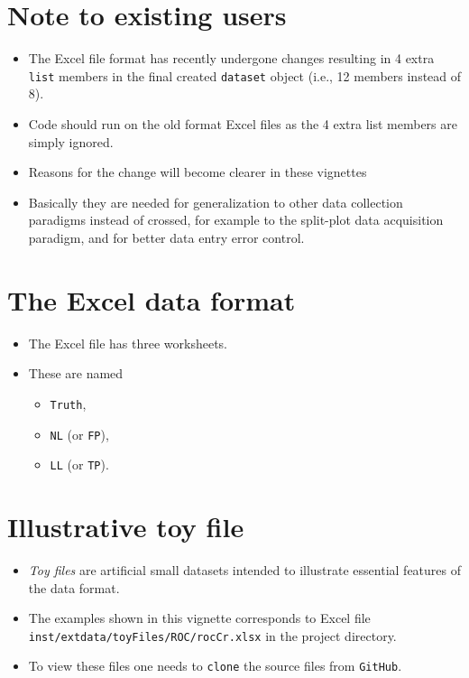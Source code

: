 \documentclass[]{book}
\providecommand{\tightlist}{%
  \setlength{\itemsep}{0pt}\setlength{\parskip}{0pt}}
\begin{document}
\hypertarget{note-to-existing-users}{%
\section{Note to existing users}\label{note-to-existing-users}}

\begin{itemize}
\tightlist
\item
  The Excel file format has recently undergone changes resulting in 4 extra \texttt{list} members in the final created \texttt{dataset} object (i.e., 12 members instead of 8).
\item
  Code should run on the old format Excel files as the 4 extra list members are simply ignored.
\item
  Reasons for the change will become clearer in these vignettes
\item
  Basically they are needed for generalization to other data collection paradigms instead of crossed, for example to the split-plot data acquisition paradigm, and for better data entry error control.
\end{itemize}

\hypertarget{the-excel-data-format}{%
\section{The Excel data format}\label{the-excel-data-format}}

\begin{itemize}
\tightlist
\item
  The Excel file has three worksheets.
\item
  These are named

  \begin{itemize}
  \tightlist
  \item
    \texttt{Truth},
  \item
    \texttt{NL} (or \texttt{FP}),
  \item
    \texttt{LL} (or \texttt{TP}).
  \end{itemize}
\end{itemize}

\hypertarget{illustrative-toy-file}{%
\section{Illustrative toy file}\label{illustrative-toy-file}}

\begin{itemize}
\tightlist
\item
  \emph{Toy files} are artificial small datasets intended to illustrate essential features of the data format.\\
\item
  The examples shown in this vignette corresponds to Excel file \texttt{inst/extdata/toyFiles/ROC/rocCr.xlsx} in the project directory.
\item
  To view these files one needs to \texttt{clone} the source files from \texttt{GitHub}.
\end{itemize}
\end{document}
